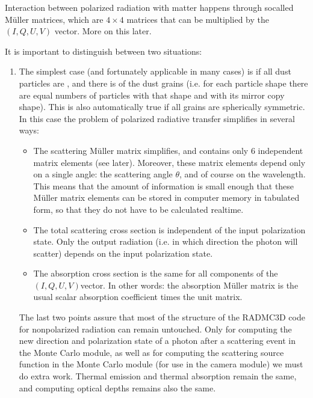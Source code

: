 \documentclass[letterpaper,10pt,english]{sphinxmanual}
\begin{document}
Interaction between polarized radiation with matter happens through so\sphinxhyphen{}called
Müller matrices, which are \(4\times 4\) matrices that can be multiplied by
the \((I,Q,U,V)\) vector. More on this later.

It is important to distinguish between two situations:
\begin{enumerate}
%
\item {} 
The simplest case (and fortunately applicable in many cases) is if all
dust particles are , and there is  of the dust grains (i.e. for each particle shape
there are equal numbers of particles with that shape and with its mirror
copy shape). This is also automatically true if all grains are spherically
symmetric. In this case the problem of polarized radiative transfer
simplifies in several ways:
\begin{itemize}
\item {} 
The scattering Müller matrix simplifies, and contains only 6
independent matrix elements (see later). Moreover, these matrix elements
depend only on a single angle: the scattering angle \(\theta\), and of
course on the wavelength. This means that the amount of information is
small enough that these Müller matrix elements can be stored in
computer memory in tabulated form, so that they do not have to be
calculated real\sphinxhyphen{}time.

\item {} 
The total scattering cross section is independent of the input
polarization state. Only the output radiation (i.e. in which
direction the photon will scatter) depends on the input polarization
state.

\item {} 
The absorption cross section is the same for all components of
the \((I,Q,U,V)\)\sphinxhyphen{}vector. In other words: the absorption Müller
matrix is the usual scalar absorption coefficient times the unit
matrix.

\end{itemize}

The last two points assure that most of the structure of the RADMC\sphinxhyphen{}3D code
for non\sphinxhyphen{}polarized radiation can remain untouched. Only for computing the
new direction and polarization state of a photon after a scattering event
in the Monte Carlo module, as well as for computing the scattering source
function in the Monte Carlo module (for use in the camera module) we must
do extra work. Thermal emission and thermal absorption remain the same,
and computing optical depths remains also the same.


\end{enumerate}
\end{document}
